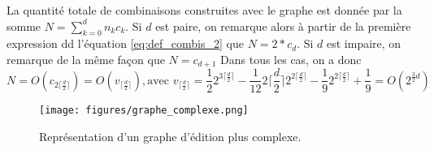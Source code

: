 \documentclass[12pt, twoside]{report}
\begin{document}
La quantité totale de combinaisons construites avec le graphe est donnée par la somme ${N=\sum_{k=0}^{d}n_kc_k}$.
Si $d$ est paire, on remarque alors à partir de la première expression dd l'équation \ref{eq:def_combis_2} que ${N=2*c_d}$. Si $d$ est impaire, on remarque de la même façon que ${N=c_{d+1}}$ Dans tous les cas, on a donc
\begin{equation}
    N=O(c_{2\lceil\frac{d}{2}\rceil})=O(v_{\lceil\frac{d}{2}\rceil}), \textrm{avec }v_{\lceil\frac{d}{2}\rceil} = \frac{1}{2}2^{3\lceil\frac{d}{2}\rceil} - \frac{1}{12}2\lceil\frac{d}{2}\rceil2^{2\lceil\frac{d}{2}\rceil} -\frac{1}{9}2^{2\lceil\frac{d}{2}\rceil} + \frac{1}{9} = O(2^{\frac{3}{2}d})
\end{equation}


\begin{figure}[h]{} 
    \centering
    \texttt{[image: figures/graphe\_complexe.png]}
    \caption{Représentation d'un graphe d'édition plus complexe.}
\end{figure} \label{fig:complex_graph}
\end{document}
